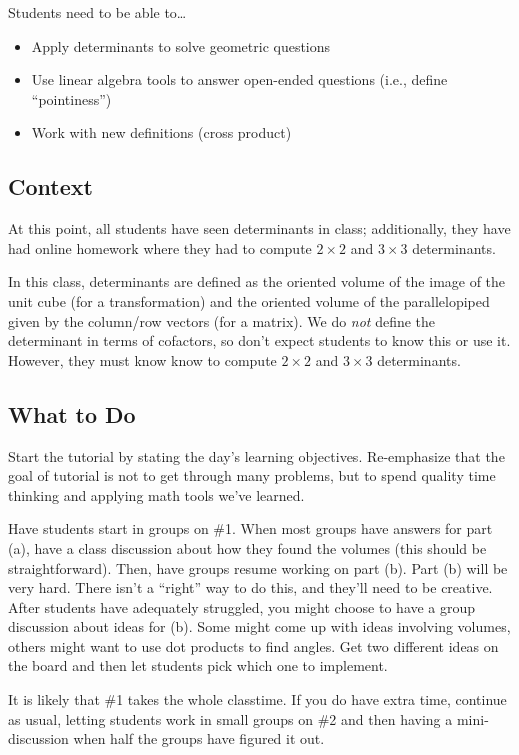 \documentclass[red]{tutorial}
\theoremstyle{definition}
\theoremstyle{theorem}
\begin{document}
	\begin{instructions}

	Students need to be able to\ldots
	\begin{itemize}
		\item Apply determinants to solve geometric questions
		\item Use linear algebra tools to answer open-ended questions (i.e., define ``pointiness'')
		\item Work with new definitions (cross product)
	\end{itemize}

\subsection*{Context}
	At this point, all students have seen determinants in class; additionally, they have had online homework
		where they had to compute $2\times 2$ and $3\times 3$ determinants.

		In this class, determinants are defined as the oriented volume of the image of the unit cube (for a 
		transformation) and the oriented volume of the parallelopiped given by the column/row vectors
		(for a matrix). We do \emph{not} define the determinant in terms of cofactors, so don't expect students
		to know this or use it. However, they must know know to compute $2\times 2$ and $3\times 3$ determinants.

\subsection*{What to Do}
	Start the tutorial by stating the day's learning objectives. Re-emphasize that the goal
		of tutorial is not to get through many problems, but to spend quality time thinking
		and applying math tools we've learned.

		Have students start in groups on \#1. When most groups have answers for part (a),
		have a class discussion about how they found the volumes (this should be straightforward). Then,
		have groups resume working on part (b). Part (b) will be very hard. There isn't a ``right'' way
		to do this,
		and they'll need to be creative. After students have adequately struggled, you might choose
		to have a group discussion about ideas for (b). Some might come up with ideas involving volumes,
		others might want to use dot products to find angles. Get two different ideas on the board and then
		let students pick which one to implement.

		It is likely that \#1 takes the whole classtime. If you do have extra time, continue as usual,
		letting students work in small groups on \#2 and then having a mini-discussion when half the groups
		have figured it out.


\end{instructions}
\end{document}
